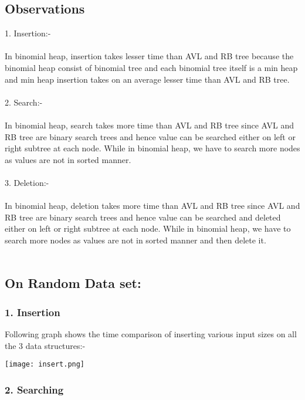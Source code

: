 \subsection*{Observations}

1. Insertion:- \\ \\
	In binomial heap, insertion takes lesser time than AVL and RB tree because the binomial heap consist of binomial tree and each binomial tree itself is a min heap and min heap insertion takes on an average lesser time than AVL and RB tree.\\ \\
	
2. Search:- \\ \\
	In binomial heap, search takes more time than AVL and RB tree since AVL and RB tree are binary search trees and hence value can be searched either on left or right subtree at each node. While in binomial heap, we have to search more nodes as values are not in sorted manner. \\ \\

3. Deletion:- \\ \\
	In binomial heap, deletion takes more time than AVL and RB tree since AVL and RB tree are binary search trees and hence value can be searched and deleted either on left or right subtree at each node. While in binomial heap, we have to search more nodes as values are not in sorted manner and then delete it. \\ \\
	
\subsection*{On Random Data set:}

\subsubsection*{1. Insertion}

Following graph shows the time comparison of inserting various input sizes on all the 3 data structures:-
	

\texttt{[image: insert.png]} 


\subsubsection*{2. Searching}


